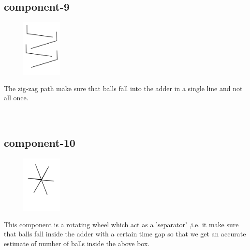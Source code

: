 \documentclass{article}
\begin{document}
\subsection{component-9}
\begin{figure}
    \centering
    \vspace{-20pt}
    \includegraphics[width=0.18\textwidth]{p9}
    \vspace{-20pt}
\end{figure}
The zig-zag path make sure that balls fall into the adder in a single line
and not all once.
\\
\\
\\

\subsection{component-10}
\begin{figure}
    \centering
    \vspace{-20pt}
    \includegraphics[width=0.18\textwidth]{p10}
    \vspace{-20pt}
\end{figure}
This component is a rotating wheel which act as a 'separator' ,i.e. it make sure that balls fall inside the adder with a certain time gap so that we get an accurate estimate of number of balls inside the above box. 
\\
\\
\\
\end{document}

